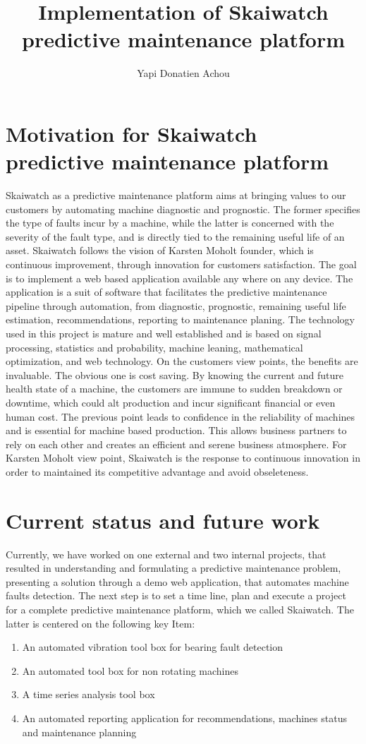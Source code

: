 \documentclass[10pt,a4paper]{article}
\author{Yapi Donatien Achou}
\title{Implementation of Skaiwatch predictive maintenance platform}
\begin{document}
\maketitle

\section{Motivation for Skaiwatch predictive maintenance platform}
Skaiwatch as a predictive maintenance platform aims at bringing values to our customers by automating machine diagnostic and prognostic. The former specifies the type of faults incur by a machine, while the latter is concerned with the severity of the fault type, and is directly tied to the remaining useful life of an asset. Skaiwatch follows the vision of Karsten Moholt founder, which is continuous improvement, through innovation for customers satisfaction.
\justify
The goal is to implement a web based application available any where on any device. The application is a suit of software that facilitates the predictive maintenance pipeline through automation, from  diagnostic, prognostic, remaining useful life estimation, recommendations, reporting to maintenance planing. The technology used in this project is mature and well established and is based on signal processing, statistics and probability, machine leaning, mathematical optimization, and web technology.
\justify
On the customers view points, the benefits are invaluable. The obvious one is cost saving. By knowing the current and future health state of a machine, the customers are immune to sudden breakdown or downtime, which could alt production and incur significant financial or even human cost. The previous point leads to confidence in the reliability of machines and is essential for machine based production. This allows business partners to rely on each other and creates an efficient and serene business atmosphere.
\justify
For Karsten Moholt view point, Skaiwatch is the response to continuous innovation in order to maintained its competitive advantage and avoid obseleteness.
\section{Current status and future work}
\label{sec:next}
Currently, we have worked on one external and two internal projects, that resulted in understanding and formulating a predictive maintenance problem, presenting a solution through a demo web application, that automates machine faults detection. 
\justify
The next step is to set a time line, plan and execute a project for a complete predictive maintenance platform, which we called Skaiwatch. The latter is centered on the following key Item:
\begin{enumerate}
	\item An automated vibration tool box for bearing fault detection
	\item An automated tool box for non rotating machines
	\item A time series analysis tool box 
	\item An automated reporting application for recommendations, machines status and maintenance planning
\end{enumerate}
\end{document}
